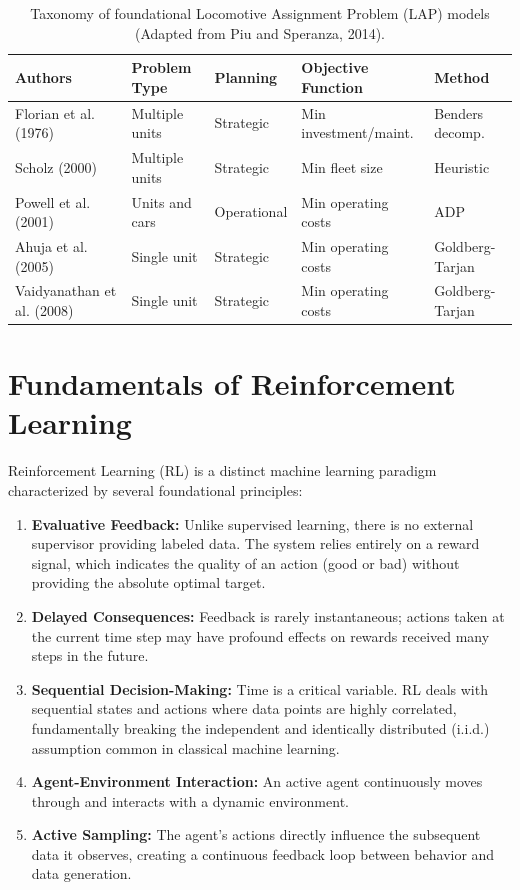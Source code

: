 \documentclass[a4paper]{scrartcl}
\begin{document}
\begin{table}[H]
    \centering
    \small
    \renewcommand{\arraystretch}{1.2}
    \begin{tabular}{|p{3.5cm}|p{2.5cm}|p{2cm}|p{3.5cm}|p{2.5cm}|}
        \hline
        \textbf{Authors} & \textbf{Problem Type} & \textbf{Planning} & \textbf{Objective Function} & \textbf{Method} \\ \hline
        Florian et al. (1976) & Multiple units & Strategic & Min investment/maint. & Benders decomp. \\ \hline
        Scholz (2000) & Multiple units & Strategic & Min fleet size & Heuristic \\ \hline
        Powell et al. (2001) & Units and cars & Operational & Min operating costs & ADP \\ \hline
        Ahuja et al. (2005) & Single unit & Strategic & Min operating costs & Goldberg-Tarjan \\ \hline
        Vaidyanathan et al. (2008) & Single unit & Strategic & Min operating costs & Goldberg-Tarjan \\ \hline
    \end{tabular}
    \caption{Taxonomy of foundational Locomotive Assignment Problem (LAP) models (Adapted from Piu and Speranza, 2014).}
    \label{tab:lap_literature_summary}
\end{table}

\section{Fundamentals of Reinforcement Learning}

Reinforcement Learning (RL) is a distinct machine learning paradigm characterized by several foundational principles:
\begin{enumerate}
    \item \textbf{Evaluative Feedback:} Unlike supervised learning, there is no external supervisor providing labeled data. The system relies entirely on a reward signal, which indicates the quality of an action (good or bad) without providing the absolute optimal target.
    \item \textbf{Delayed Consequences:} Feedback is rarely instantaneous; actions taken at the current time step may have profound effects on rewards received many steps in the future.
    \item \textbf{Sequential Decision-Making:} Time is a critical variable. RL deals with sequential states and actions where data points are highly correlated, fundamentally breaking the independent and identically distributed (i.i.d.) assumption common in classical machine learning.
    \item \textbf{Agent-Environment Interaction:} An active agent continuously moves through and interacts with a dynamic environment.
    \item \textbf{Active Sampling:} The agent's actions directly influence the subsequent data it observes, creating a continuous feedback loop between behavior and data generation.
\end{enumerate}
\end{document}
